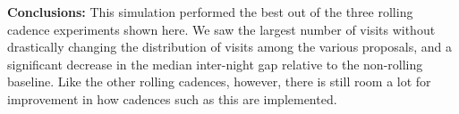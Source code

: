 \documentclass[DM,lsstdraft,authoryear,toc]{lsstdoc}
\begin{document}
\textbf{Conclusions:} This simulation performed the best out of the three rolling cadence experiments shown here. We saw the
largest number of visits without drastically changing the distribution of visits among the various proposals, and a 
significant decrease in the median inter-night gap relative to the non-rolling baseline. Like the other rolling cadences, however, 
there is still room a lot for improvement in how cadences such as this are implemented. 


%
\end{document}
